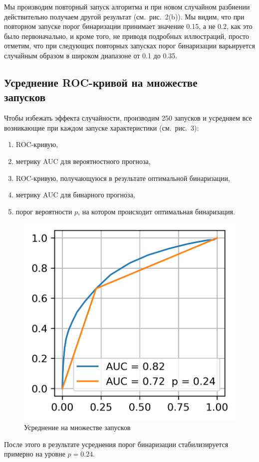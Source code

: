\noindent
Мы производим повторный запуск алгоритма и при новом случайном разбиении действительно получаем другой результат (см. рис.~2(b)).
Мы видим, что при повторном запуске порог бинаризации принимает значение 0.15, а не 0.2, как это было первоначально, и кроме того, не приводя подробных иллюстраций, просто отметим, что при следующих повторных запусках порог бинаризации варьируется случайным образом в широком диапазоне от 0.1 до 0.35.

\subsection{Усреднение ROC-кривой на множестве\\запусков}
Чтобы избежать эффекта случайности, производим 250 запусков и усредняем все возникающие при каждом запуске характеристики (см. рис.~3):
\medskip
\begin{enumerate}
	\item ROC-кривую,
	\item метрику AUC для вероятностного прогноза,
	\item ROC-кривую, получающуюся в результате оптимальной бинаризации,
	\item метрику AUC для бинарного прогноза,
	\item порог вероятности $p$, на котором происходит оптимальная бинаризация.
\end{enumerate}
\medskip
\begin{figure}[!htb]
	\centering
	\begin{minipage}{0.32\textwidth}
		\includegraphics[width=\linewidth]{pictures/Усредненная бинаризация}
	\end{minipage}
	\caption{Усреднение на множестве запусков}
\end{figure}
\medskip
\noindent
После этого в результате усреднения порог бинаризации стабилизируется примерно на уровне $p=0.24$.

